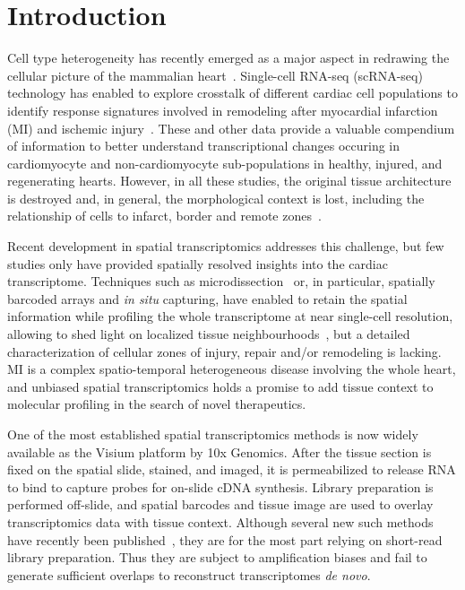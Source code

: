 \documentclass[utf8]{FrontiersinHarvard} %
\newcommand{\insi}{\textit{in situ}\xspace}
\newcommand{\denovo}{\textit{de novo}\xspace}
\begin{document}
\section*{Introduction}
Cell type heterogeneity has recently emerged as a major aspect in redrawing the cellular picture of the mammalian heart~\citep{Wang2020:human_heart,Tucker2020:human_heart,Litvinukova2020:human_heart}. 
Single-cell RNA-seq (scRNA-seq) technology has enabled to explore crosstalk of different cardiac cell populations to identify response signatures involved in remodeling after myocardial infarction (MI) and ischemic injury~\citep{Cui2020:regenerative_cm,Forte2020:interstitial,Ruiz-Villalba2020:CF,Vafadarnejad2020:cardiac_neutrophil,Molenaar2021:ischemic,Gladka2021:CM_ZEB2,Tombor2021:endothelial_plasticity,Heinrichs2021:B-cell}.
These and other data provide a valuable compendium of information to better understand transcriptional changes occuring in cardiomyocyte and non-cardiomyocyte sub-populations in healthy, injured, and regenerating hearts.
However, in all these studies, the original tissue architecture is destroyed and, in general, the morphological context is lost, including the relationship of cells to infarct, border and remote zones~\citep{Duijvenboden2019:border_zone}.

Recent development in spatial transcriptomics addresses this challenge, but few studies only have provided spatially resolved insights into the cardiac transcriptome.
Techniques such as microdissection~\citep{Wu2016:zebrafish_cm,Burkhard2018:embryonic_heart} or, in particular, spatially barcoded arrays and \insi capturing, have enabled to retain the spatial information while profiling the whole transcriptome at near single-cell resolution, allowing to shed light on localized tissue neighbourhoods~\citep{Asp2017:fetal_markers,Asp2019:spatial_atlas_devel_heart}, but a detailed characterization of cellular zones of injury, repair and/or remodeling is lacking. MI is a complex spatio-temporal heterogeneous disease involving the whole heart, and unbiased spatial transcriptomics holds a promise to add tissue context to molecular profiling in the search of novel therapeutics.

One of the most established spatial transcriptomics methods is now widely available as the Visium platform by 10x Genomics. 
After the tissue section is fixed on the spatial slide, stained, and imaged, it is permeabilized to release RNA to bind to capture probes for on-slide cDNA synthesis.
Library preparation is performed off-slide, and spatial barcodes and tissue image are used to overlay transcriptomics data with tissue context.
Although several new such methods have recently been published~\citep{Rodriques2019:slide-seq,Liu2020:DBiT-seq}, they are for the most part relying on short-read library preparation. Thus they are subject to amplification biases and fail to generate sufficient overlaps to reconstruct transcriptomes \denovo.
\end{document}
